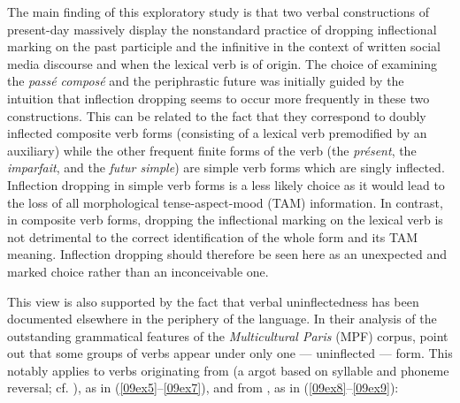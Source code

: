 \documentclass[output=paper,colorlinks,citecolor=brown]{langscibook}
\begin{document}
The main finding of this exploratory study is that two verbal constructions of present-day  massively display the nonstandard practice of dropping inflectional marking on the past participle and the infinitive in the context of written social media discourse and when the lexical verb is of  origin. The choice of examining the \emph{passé composé} and the periphrastic future was initially guided by the intuition that inflection dropping seems to occur more frequently in these two constructions. This can be related to the fact that they correspond to doubly inflected composite verb forms (consisting of a lexical verb premodified by an auxiliary) while the other frequent finite forms of the  verb (the \emph{présent}, the \emph{imparfait}, and the \emph{futur simple}) are simple verb forms which are singly inflected. Inflection dropping in simple verb forms is a less likely choice as it would lead to the loss of all morphological tense-aspect-mood (TAM) information. In contrast, in composite verb forms, dropping the inflectional marking on the lexical verb is not detrimental to the correct identification of the whole form and its TAM meaning. Inflection dropping should therefore be seen here as an unexpected and marked choice rather than an inconceivable one.

This view is also supported by the fact that verbal uninflectedness has been documented elsewhere in the periphery of the  language. In their analysis of the outstanding grammatical features of the \emph{Multicultural Paris } (MPF) corpus, \citet{cappeaumoreno2017} point out that some groups of  verbs appear under only one --- uninflected --- form. This notably applies to verbs originating from \emph{} (a  argot based on syllable and phoneme reversal; cf. \citealt{mela1997}), as in (\ref{09ex5}--\ref{09ex7}), and from , as in (\ref{09ex8}--\ref{09ex9}):
\end{document}
